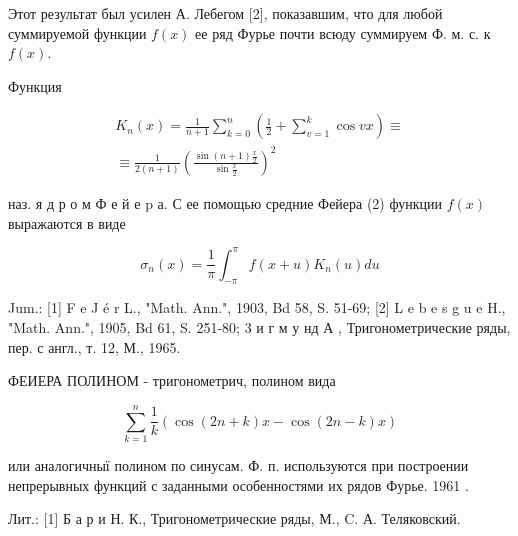 \documentclass[10pt]{article}
\begin{document}
Этот результат был усилен А. Лебегом [2], показавшим, что для любой суммируемой функции $f(x)$ ее ряд Фурье почти всюду суммируем Ф. м. с. к $f(x)$.



Функция



\[

\begin{gathered}

K_{n}(x)=\frac{1}{n+1} \sum_{k=0}^{n}\left(\frac{1}{2}+\sum_{v=1}^{k} \cos v x\right) \equiv \\

\equiv \frac{1}{2(n+1)}\left(\frac{\sin (n+1) \frac{x}{2}}{\sin \frac{x}{2}}\right)^{2}

\end{gathered}

\]



наз. я д р о м Ф е й е $\mathrm{p}$ а. С ее помощью средние Фейера (2) функции $f(x)$ выражаются в виде



\[

\sigma_{n}(x)=\frac{1}{\pi} \int_{-\pi}^{\pi} f(x+u) K_{n}(u) d u

\]



Jum.: [1] F e J é r L., "Math. Ann.", 1903, Bd 58, S. 51-69; [2] L e b e s g u e H., "Math. Ann.", 1905, Bd 61, S. 251-80; 3 и г м у нд А , Тригонометрические ряды, пер. с англ., т. 12, М., 1965.

ФЕИЕРА ПОЛИНОМ - тригонометрич, полином вида



\[

\sum_{k=1}^{n} \frac{1}{k}(\cos (2 n+k) x-\cos (2 n-k) x)

\]



или аналогичныї полином по синусам. Ф. п. используются при построении непрерывных функций с заданными особенностями их рядов Фурье. 1961 .



Лит.: [1] Б а р и Н. К., Тригонометрические ряды, М., C. А. Теляковский.
\end{document}
